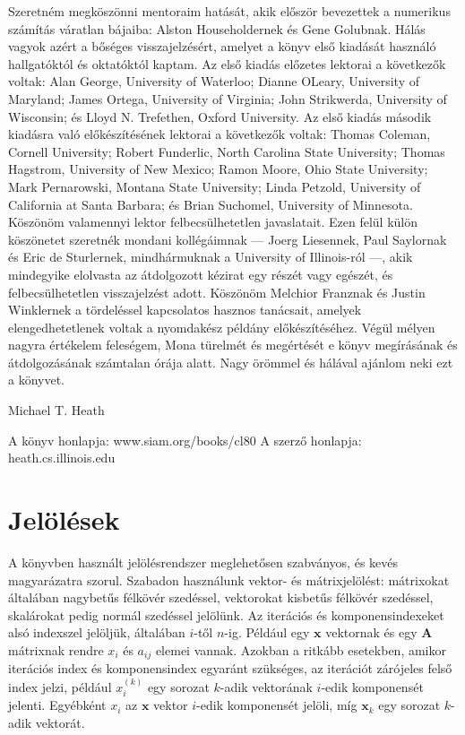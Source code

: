 \documentclass[
  magyar,
  11pt]{article}
\providecommand{\boldsymbol}[1]{\mathbf{#1}}
\begin{document}
Szeretném megköszönni mentoraim hatását, akik először bevezettek a
numerikus számítás váratlan bájaiba: Alston Householdernek és Gene
Golubnak. Hálás vagyok azért a bőséges visszajelzésért, amelyet a könyv
első kiadását használó hallgatóktól és oktatóktól kaptam. Az első kiadás
előzetes lektorai a következők voltak: Alan George, University of
Waterloo; Dianne O\textquotesingle Leary, University of Maryland; James
Ortega, University of Virginia; John Strikwerda, University of
Wisconsin; és Lloyd N. Trefethen, Oxford University. Az első kiadás
második kiadásra való előkészítésének lektorai a következők voltak:
Thomas Coleman, Cornell University; Robert Funderlic, North Carolina
State University; Thomas Hagstrom, University of New Mexico; Ramon
Moore, Ohio State University; Mark Pernarowski, Montana State
University; Linda Petzold, University of California at Santa Barbara; és
Brian Suchomel, University of Minnesota. Köszönöm valamennyi lektor
felbecsülhetetlen javaslatait. Ezen felül külön köszönetet szeretnék
mondani kollégáimnak --- Joerg Liesennek, Paul Saylornak és Eric de
Sturlernek, mindhármuknak a University of Illinois-ról ---, akik
mindegyike elolvasta az átdolgozott kézirat egy részét vagy egészét, és
felbecsülhetetlen visszajelzést adott. Köszönöm Melchior Franznak és
Justin Winklernek a tördeléssel kapcsolatos hasznos tanácsait, amelyek
elengedhetetlenek voltak a nyomdakész példány előkészítéséhez. Végül
mélyen nagyra értékelem feleségem, Mona türelmét és megértését e könyv
megírásának és átdolgozásának számtalan órája alatt. Nagy örömmel és
hálával ajánlom neki ezt a könyvet.

Michael T. Heath

A könyv honlapja: www.siam.org/books/cl80 A szerző honlapja:
heath.cs.illinois.edu

\section{Jelölések}\label{jeluxf6luxe9sek}

A könyvben használt jelölésrendszer meglehetősen szabványos, és kevés
magyarázatra szorul. Szabadon használunk vektor- és mátrixjelölést:
mátrixokat általában nagybetűs félkövér szedéssel, vektorokat kisbetűs
félkövér szedéssel, skalárokat pedig normál szedéssel jelölünk. Az
iterációs és komponensindexeket alsó indexszel jelöljük, általában
\(i\)-től \(n\)-ig. Például egy \(\boldsymbol{x}\) vektornak és egy
\(\boldsymbol{A}\) mátrixnak rendre \(x_i\) és \(a_{ij}\) elemei vannak.
Azokban a ritkább esetekben, amikor iterációs index és komponensindex
egyaránt szükséges, az iterációt zárójeles felső index jelzi, például
\(x_i^{(k)}\) egy sorozat \(k\)-adik vektorának \(i\)-edik komponensét
jelenti. Egyébként \(x_i\) az \(\boldsymbol{x}\) vektor \(i\)-edik
komponensét jelöli, míg \(\boldsymbol{x}_k\) egy sorozat \(k\)-adik
vektorát.
\end{document}
